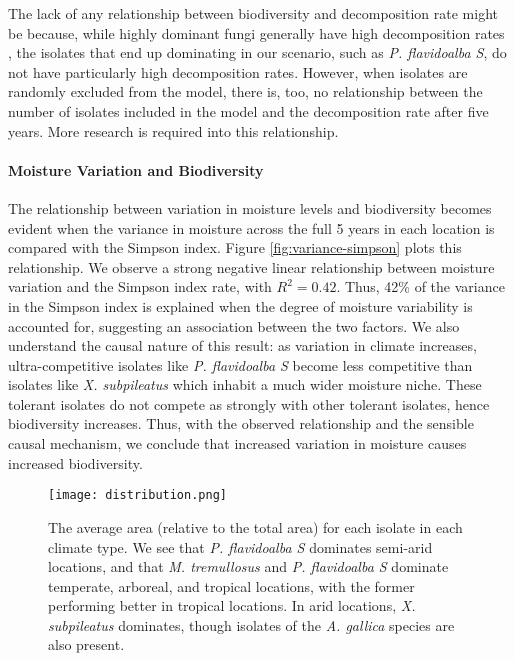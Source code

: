 \documentclass[12pt]{article}
\begin{document}
The lack of any relationship between biodiversity and decomposition rate might be because, while highly dominant fungi generally have high decomposition rates \cite{trait-based}, the isolates that end up dominating in our scenario, such as \emph{P. flavidoalba S}, do not have particularly high decomposition rates. However, when isolates are randomly excluded from the model, there is, too, no relationship between the number of isolates included in the model and the decomposition rate after five years. More research is required into this relationship.

\paragraph{Moisture Variation and Biodiversity}
The relationship between variation in moisture levels and biodiversity becomes evident when the variance in moisture across the full 5 years in each location is compared with the Simpson index. Figure \ref{fig:variance-simpson} plots this relationship. We observe a strong negative linear relationship between moisture variation and the Simpson index rate, with $R^2=0.42$. Thus, 42\% of the variance in the Simpson index is explained when the degree of moisture variability is accounted for, suggesting an association between the two factors. We also understand the causal nature of this result: as variation in climate increases, ultra-competitive isolates like \emph{P. flavidoalba S} become less competitive than isolates like \emph{X. subpileatus} which inhabit a much wider moisture niche. These tolerant isolates do not compete as strongly with other tolerant isolates, hence biodiversity increases. Thus, with the observed relationship and the sensible causal mechanism, we conclude that increased variation in moisture causes increased biodiversity.

\begin{figure}[!ht]
 \centering

\texttt{[image: distribution.png]}
\caption{The average area (relative to the total area) for each isolate in each climate type. We see that \emph{P. flavidoalba S} dominates semi-arid locations, and that \emph{M. tremullosus} and \emph{P. flavidoalba S} dominate temperate, arboreal, and tropical locations, with the former performing better in tropical locations. In arid locations, \emph{X. subpileatus} dominates, though isolates of the \emph{A. gallica} species are also present.} \label{fig:distribution}
\end{figure}
\end{document}
